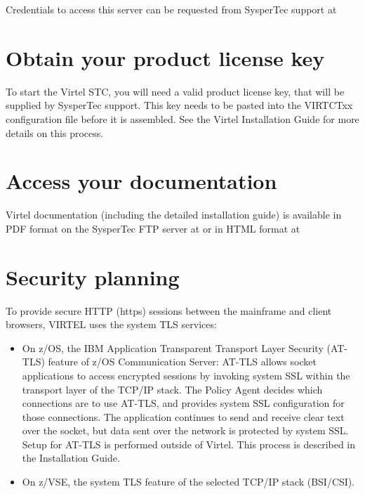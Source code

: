 \documentclass[letterpaper,10pt,english]{sphinxmanual}
\begin{document}
Credentials to access this server can be requested from SysperTec support at 


\section{Obtain your product license key}
\label{\detokenize{Getting_Started:obtain-your-product-license-key}}
To start the Virtel STC, you will need a valid product license key, that will be supplied by SysperTec support. This key needs to be pasted into the VIRTCTxx configuration file before it is assembled. See the Virtel Installation Guide for more details on this process.


\section{Access your documentation}
\label{\detokenize{Getting_Started:access-your-documentation}}
Virtel documentation (including the detailed installation guide) is available in PDF format on the SysperTec FTP server at  or in HTML format at 


\section{Security planning}
\label{\detokenize{Getting_Started:security-planning}}
To provide secure HTTP (https) sessions between the mainframe and client browsers, VIRTEL uses the system TLS services:
\begin{itemize}
\item {} 
On z/OS, the IBM Application Transparent Transport Layer Security (AT-TLS) feature of z/OS Communication Server: AT-TLS allows socket applications to access encrypted sessions by invoking system SSL within the transport layer of the TCP/IP stack. The Policy Agent decides which connections are to use AT-TLS, and provides system SSL configuration for those connections. The application continues to send and receive clear text over the socket, but data sent over the network is protected by system SSL. Setup for AT-TLS is performed outside of Virtel. This process is described in the Installation Guide.

\item {} 
On z/VSE, the system TLS feature of the selected TCP/IP stack (BSI/CSI).

\end{itemize}
\end{document}
